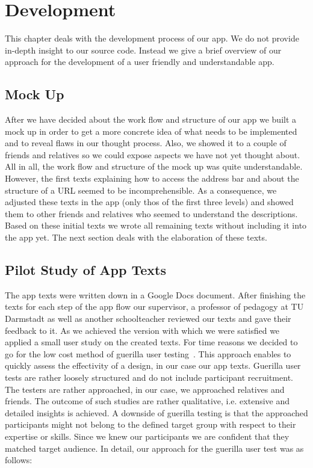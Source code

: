 
\section{Development}
This chapter deals with the development process of our app.
We do not provide in-depth insight to our source code. 
Instead we give a brief overview of our approach for the development of a user friendly and understandable app.
\subsection{Mock Up}
After we have decided about the work flow and structure of our app we built a mock up in order to get a more concrete idea of what needs to be implemented and to reveal flaws in our thought process.
Also, we showed it to a couple of friends and relatives so we could expose aspects we have not yet thought about.
All in all, the work flow and structure of the mock up was quite understandable.
However, the first texts explaining how to access the address bar and about the structure of a URL seemed to be incomprehensible.
As a consequence, we adjusted these texts in the app (only thos of the first three levels) and showed them to other friends and relatives who seemed to understand the descriptions.
Based on these initial texts we wrote all remaining texts without including it into the app yet.
The next section deals with the elaboration of these texts.
\subsection{Pilot Study of App Texts}
The app texts were written down in a Google Docs document.
After finishing the texts for each step of the app flow our supervisor, a professor of pedagogy at TU Darmstadt as well as another schoolteacher reviewed our texts and gave their feedback to it.
As we achieved the version with which we were satisfied we applied a small user study on the created texts. 
For time reasons we decided to go for the low cost method of guerilla user testing~\cite{guerillagovuk, guerillauxbooth}.
This approach enables to quickly assess the effectivity of a design, in our case our app texts.
Guerilla user tests are rather loosely structured and do not include participant recruitment.
The testers are rather approached, in our case, we approached relatives and friends. 
The outcome of such studies are rather qualitative, i.e. extensive and detailed insights is achieved.
A downside of guerilla testing is that the approached participants might not belong to the defined target group with respect to their expertise or skills. 
Since we knew our participants we are confident that they matched target audience. 
In detail, our approach for the guerilla user test was as follows:

